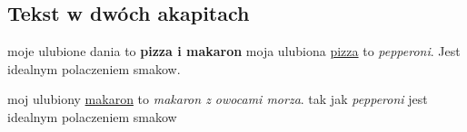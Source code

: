 \subsection{Tekst w dwóch akapitach}
moje ulubione dania to \textbf{pizza i makaron} 
moja ulubiona \underline{pizza} to \textit{pepperoni}. Jest idealnym polaczeniem smakow.\par

moj ulubiony \underline{makaron} to \textit{makaron z owocami morza}. tak jak \textit{pepperoni} jest idealnym polaczeniem smakow
